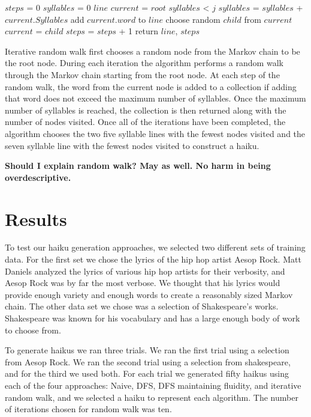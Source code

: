 \documentclass[]{article}
\newcommand{\comment}[1]
{\par {\bfseries \color{green} #1 \par}}
\begin{document}
\begin{algorithm}[H]
	\caption{$RandomWalk(root, j)$} \label{RandomWalk}
	\begin{algorithmic}[1]
		\State $steps$ = 0
		\State $syllables$ = 0
		\State $line$
		\State $current$ = $root$
		\While $syllables$ < $j$
				$syllables$ = $syllables$ + $current.Syllables$
				\State add $current.word$ to $line$
			\EndIf
			\State choose random $child$ from $current$
			$current$ = $child$
			$steps$ = $steps$ + 1
		\EndWhile
		\State return $line$, $steps$
	\end{algorithmic}
\end{algorithm}

Iterative random walk first chooses a random node from the Markov chain to be the root node. During each iteration the algorithm performs a random walk through the Markov chain starting from the root node. At each step of the random walk, the word from the current node is added to a collection if adding that word does not exceed the maximum number of syllables. Once the maximum number of syllables is reached, the collection is then returned along with the number of nodes visited. Once all of the iterations have been completed, the algorithm chooses the two five syllable lines with the fewest nodes visited and the seven syllable line with the fewest nodes visited to construct a haiku. 

\comment{Should I explain random walk? May as well. No harm in being overdescriptive.}

\section{Results}
To test our haiku generation approaches, we selected two different sets of training data. For the first set we chose the lyrics of the hip hop artist Aesop Rock. Matt Daniels analyzed the lyrics of various hip hop artists for their verbosity, and Aesop Rock was by far the most verbose\cite{Vocab}. We thought that his lyrics would provide enough variety and enough words to create a reasonably sized Markov chain. The other data set we chose was a selection of Shakespeare's works. Shakespeare was known for his vocabulary and has a large enough body of work to choose from.

To generate haikus we ran three trials. We ran the first trial using a selection from Aesop Rock. We ran the second trial using a selection from shakespeare, and for the third we used both. For each trial we generated fifty haikus using each of the four approaches: Naive, DFS, DFS maintaining fluidity, and iterative random walk, and we selected a haiku to represent each algorithm. The number of iterations chosen for random walk was ten.
\end{document}
